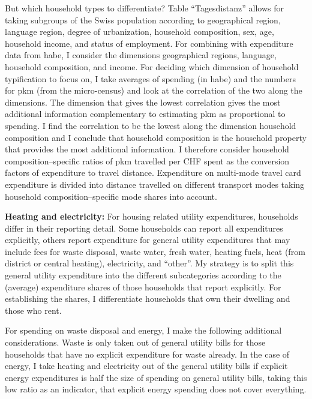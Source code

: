 \documentclass[referee, lineno, pdflatex,sn-apa]{sn-jnl}%
\theoremstyle{thmstyleone}%
\theoremstyle{thmstyletwo}%
\theoremstyle{thmstylethree}%
\begin{document}
\begin{appendices}
But which household types to differentiate?
Table ``Tagesdistanz'' allows for taking subgroups of the Swiss population according to geographical region, language region, degree of urbanization, household composition, sex, age, household income, and status of employment.
For combining with expenditure data from \ac{habe}, I consider the dimensions geographical regions, language, household composition, and income.
For deciding which dimension of household typification to focus on, I take averages of spending (in \ac{habe}) and the numbers for \ac{pkm} (from the micro-census) and look at the correlation of the two along the dimensions.
The dimension that gives the lowest correlation gives the most additional information complementary to estimating \ac{pkm} as proportional to spending.
I find the correlation to be the lowest along the dimension household composition and I conclude that household composition is the household property that provides the most additional information.
I therefore consider household composition--specific ratios of \ac{pkm} travelled per CHF spent as the conversion factors of expenditure to travel distance.
Expenditure on multi-mode travel card expenditure is divided into distance travelled on different transport modes taking household composition--specific mode shares into account.

{\bfseries Heating and electricity:}
For housing related utility expenditures, households differ in their reporting detail.
Some households can report all expenditures explicitly, others report expenditure for general utility expenditures that may include fees for waste disposal, waste water, fresh water, heating fuels, heat (from district or central heating), electricity, and ``other''.
My strategy is to split this general utility expenditure into the different subcategories according to the (average) expenditure shares of those households that report explicitly.
For establishing the shares, I differentiate households that own their dwelling and those who rent.

For spending on waste disposal and energy, I make the following additional considerations.
Waste is only taken out of general utility bills for those households that have no explicit expenditure for waste already.
In the case of energy, I take heating and electricity out of the general utility bills if explicit energy expenditures is half the size of spending on general utility bills, taking this low ratio as an indicator, that explicit energy spending does not cover everything.


\end{appendices}
\end{document}
